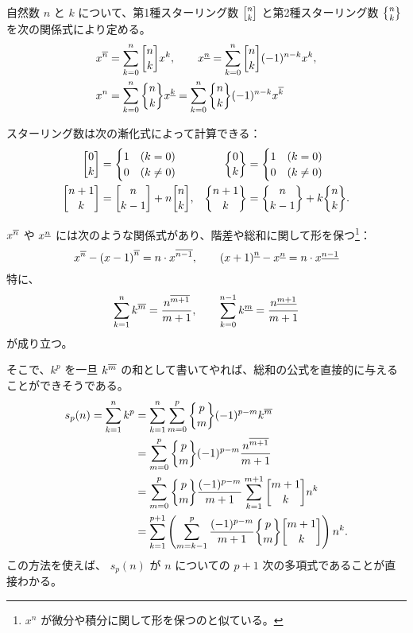 {自然数 $n$ と $k$ について、第1種スターリング数 $\stirlingI{n}{k}$ と第2種スターリング数 $\stirlingII{n}{k}$ を次の関係式により定める。
\begin{align*}
  \risingFactorial{x}{n}&=\sum_{k=0}^n \stirlingI{n}{k} x^k, \qquad
  \fallingFactorial{x}{n}=\sum_{k=0}^n \stirlingI{n}{k} (-1)^{n-k} x^k, \\
  x^n&=\sum_{k=0}^n \stirlingII{n}{k} \fallingFactorial{x}{k}
       =\sum_{k=0}^n \stirlingII{n}{k} (-1)^{n-k} \risingFactorial{x}{k}
\end{align*}

スターリング数は次の漸化式によって計算できる：
\begin{align*}
  \stirlingI{0}{k}&=\begin{cases}
    1 & (k=0) \\
    0 & (k\ne 0)
  \end{cases} &
  \stirlingII{0}{k}&=\begin{cases}
    1 & (k=0) \\
    0 & (k\ne 0)
  \end{cases} \\
  \stirlingI{n+1}{k}&=\stirlingI{n}{k-1}+n\stirlingI{n}{k}, &
  \stirlingII{n+1}{k}&=\stirlingII{n}{k-1}+k\stirlingII{n}{k}.
\end{align*}

${x}^{\overline{n}}$ や ${x}^{\underline{n}}$ には次のような関係式があり、階差や総和に関して形を保つ\footnote{$x^n$ が微分や積分に関して形を保つのと似ている。}：
\begin{equation*}
  {x}^{\overline{n}}-{(x-1)}^{\overline{n}}=n\cdot{x}^{\overline{n-1}}, \qquad
  {(x+1)}^{\underline{n}}-{x}^{\underline{n}}=n\cdot{x}^{\underline{n-1}}
\end{equation*}
特に、
\begin{equation*}
  \sum_{k=1}^{n} {k}^{\overline{m}}
  =\frac{{n}^{\overline{m+1}}}{m+1}, \qquad
  \sum_{k=0}^{n-1} {k}^{\underline{m}}
  =\frac{{n}^{\underline{m+1}}}{m+1}
\end{equation*}
が成り立つ。

そこで、$k^p$ を一旦 ${k}^{\overline{m}}$ の和として書いてやれば、総和の公式を直接的に与えることができそうである。
\begin{align*}
  s_p(n)=\sum_{k=1}^n k^p
  &=\sum_{k=1}^n \sum_{m=0}^p \stirlingII{p}{m}(-1)^{p-m} \risingFactorial{k}{m} \\
  &=\sum_{m=0}^p \stirlingII{p}{m}(-1)^{p-m} \frac{\risingFactorial{n}{m+1}}{m+1} \\
  &=\sum_{m=0}^p \stirlingII{p}{m}\frac{(-1)^{p-m}}{m+1} \sum_{k=1}^{m+1} \stirlingI{m+1}{k} n^k \\
  &=\sum_{k=1}^{p+1} \left(\sum_{m=k-1}^p \frac{(-1)^{p-m}}{m+1} \stirlingII{p}{m} \stirlingI{m+1}{k}\right) n^k.
\end{align*}
この方法を使えば、 $s_p(n)$ が $n$ についての $p+1$ 次の多項式であることが直接わかる。

}
